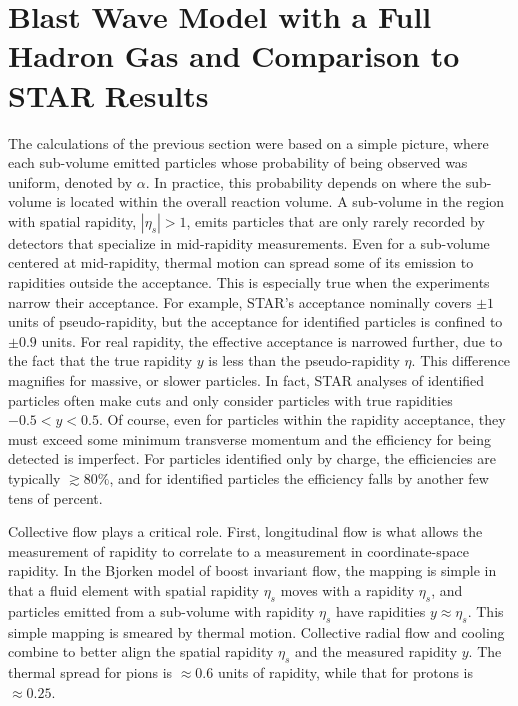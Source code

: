 
\section{Blast Wave Model with a Full Hadron Gas and Comparison to STAR Results}\label{sec:blast}

The calculations of the previous section were based on a simple picture, where each sub-volume emitted particles whose probability of being observed was uniform, denoted by $\alpha$. In practice, this probability depends on where the sub-volume is located within the overall reaction volume. A sub-volume in the region with spatial rapidity, $|\eta_s|>1$, emits particles that are only rarely recorded by detectors that specialize in mid-rapidity measurements. Even for a sub-volume centered at mid-rapidity, thermal motion can spread some of its emission to rapidities outside the acceptance. This is especially true when the experiments narrow their acceptance. For example, STAR's acceptance nominally covers $\pm 1$ units of pseudo-rapidity, but the acceptance for identified particles is confined to $\pm 0.9$ units. For real rapidity, the effective acceptance is narrowed further, due to the fact that the true rapidity $y$ is less than the pseudo-rapidity $\eta$. This difference magnifies for massive, or slower particles. In fact, STAR analyses of identified particles often make cuts and only consider particles with true rapidities $-0.5<y<0.5$. Of course, even for particles within the rapidity acceptance, they must exceed some minimum transverse momentum and the efficiency for being detected is imperfect. For particles identified only by charge, the efficiencies are typically $\gtrsim 80\%$, and for identified particles the efficiency falls by another few tens of percent.

Collective flow plays a critical role. First, longitudinal flow is what allows the measurement of rapidity to correlate to a measurement in coordinate-space rapidity. In the Bjorken model of boost invariant flow, the mapping is simple in that a fluid element with spatial rapidity $\eta_s$ moves with a rapidity $\eta_s$, and particles emitted from a sub-volume with rapidity $\eta_s$ have rapidities $y\approx\eta_s$. This simple mapping is smeared by thermal motion. Collective radial flow and cooling combine to better align the spatial rapidity $\eta_s$ and the measured rapidity $y$. The thermal spread for pions is $\approx 0.6$ units of rapidity, while that for protons is $\approx 0.25$.

